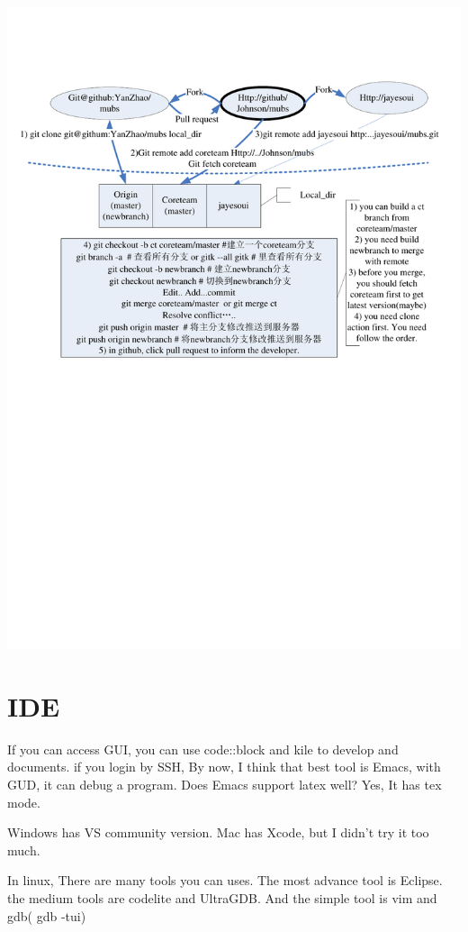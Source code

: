\documentclass[a4paper,12pt,twoside]{book}
\begin{document}
    \includegraphics[scale=0.7]{pics/Visio-git_cooperate}



\section{IDE}
If you can access GUI, you can use code::block and kile to develop and documents. if
you login by SSH, By now, I think that best tool is Emacs, with GUD, it can debug a
program. Does Emacs support latex well? Yes, It has tex mode. \par

Windows has VS community version.  Mac has Xcode, but I didn't try it too much. 

In linux, There are many tools you can uses. The most advance tool is Eclipse. the medium tools are codelite and UltraGDB. And the simple tool is vim and gdb( gdb -tui) \\
\end{document}
